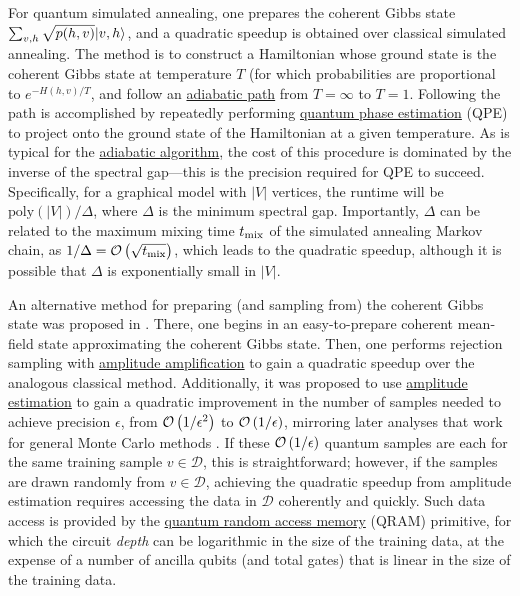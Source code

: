 \begin{refsection}
For quantum simulated annealing, one prepares the coherent Gibbs state $\sum_{v,h} \sqrt{p(h,v)}\lvert v,h\rangle$, and a quadratic speedup is obtained over classical simulated annealing. The method is to construct a Hamiltonian whose ground state is the coherent Gibbs state at temperature $T$ (for which probabilities are proportional to $e^{-H(h,v)/T}$, and follow an \hyperref[prim:QuantumAdiabaticAlgorithm]{adiabatic path} from $T=\infty$ to $T=1$. Following the path is accomplished by repeatedly performing \hyperref[prim:QPE]{quantum phase estimation} (QPE) to project onto the ground state of the Hamiltonian at a given temperature. As is typical for the \hyperref[prim:QuantumAdiabaticAlgorithm]{adiabatic algorithm}, the cost of this procedure is dominated by the inverse of the spectral gap---this is the precision required for QPE to succeed. Specifically, for a graphical model with $|V|$ vertices, the runtime will be $\mathrm{poly}(|V|)/\Delta$, where $\Delta$ is the minimum spectral gap. Importantly, $\Delta$ can be related to the maximum mixing time $t_{\rm mix}$ of the simulated annealing Markov chain, as $1/\Delta = \mathcal{O}\left( \sqrt{t_{\rm mix}} \right)$, which leads to the quadratic speedup, although it is possible that $\Delta$ is exponentially small in $|V|$. 

An alternative method for preparing (and sampling from) the coherent Gibbs state was proposed in \cite{wiebe2014quantum}. There, one begins in an easy-to-prepare coherent mean-field state approximating the coherent Gibbs state. Then, one performs rejection sampling with \hyperref[prim:AmpAmp]{amplitude amplification} to gain a quadratic speedup over the analogous classical method. Additionally, it was proposed to use \hyperref[prim:AmpEst]{amplitude estimation} to gain a quadratic improvement in the number of samples needed to achieve precision $\epsilon$, from $\mathcal{O}\left( 1/\epsilon^2 \right)$ to $\mathcal{O}\left( 1/\epsilon \right)$, mirroring later analyses that work for general Monte Carlo methods \cite{montanaro2015QMonteCarlo}. If these $\mathcal{O}\left( 1/\epsilon \right)$ quantum samples are each for the same training sample $v \in \mathcal{D}$, this is straightforward; however, if the samples are drawn randomly from $v \in \mathcal{D}$, achieving the quadratic speedup from amplitude estimation requires accessing the data in $\mathcal{D}$ coherently and quickly. Such data access is provided by the \hyperref[prim:QRAM]{quantum random access memory} (QRAM) primitive, for which the circuit \textit{depth} can be logarithmic in the size of the training data, at the expense of a number of ancilla qubits (and total gates) that is linear in the size of the training data.


\end{refsection}
